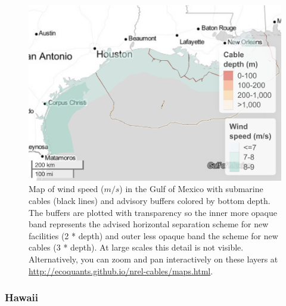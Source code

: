 \documentclass[]{article}
\begin{document}
\begin{figure}
\centering
\includegraphics{report_files/figure-latex/mapWindGulfofMexico-1.pdf}
\caption{\label{fig:mapWindGulfofMexico}Map of wind speed (\(m/s\)) in the
Gulf of Mexico with submarine cables (black lines) and advisory buffers
colored by bottom depth. The buffers are plotted with transparency so
the inner more opaque band represents the advised horizontal separation
scheme for new facilities (2 * depth) and outer less opaque band the
scheme for new cables (3 * depth). At large scales this detail is not
visible. Alternatively, you can zoom and pan interactively on these
layers at \url{http://ecoquants.github.io/nrel-cables/maps.html}.}
\end{figure}

\hypertarget{hawaii-1}{%
\subsubsection{Hawaii}\label{hawaii-1}}
\end{document}
